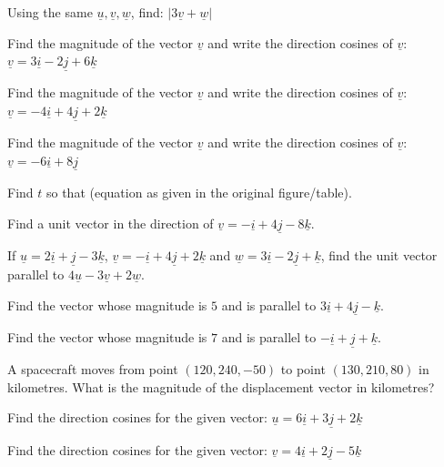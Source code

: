 \documentclass[11pt,a4paper]{article}
\begin{document}
\begin{shortlist}
\item Using the same $\underline{u},\underline{v},\underline{w}$, find: $|3\underline{v}+\underline{w}|$

\item Find the magnitude of the vector $\underline{v}$ and write the direction cosines of $\underline{v}$: $\underline{v}=3\underline{i}-2\underline{j}+6\underline{k}$

\item Find the magnitude of the vector $\underline{v}$ and write the direction cosines of $\underline{v}$: $\underline{v}=-4\underline{i}+4\underline{j}+2\underline{k}$

\item Find the magnitude of the vector $\underline{v}$ and write the direction cosines of $\underline{v}$: $\underline{v}=-6\underline{i}+8\underline{j}$

\item Find $t$ so that (equation as given in the original figure/table).

\item Find a unit vector in the direction of $\underline{v}=-\underline{i}+4\underline{j}-8\underline{k}$.

\item If $\underline{u}=2\underline{i}+\underline{j}-3\underline{k}$, $\underline{v}=-\underline{i}+4\underline{j}+2\underline{k}$ and $\underline{w}=3\underline{i}-2\underline{j}+\underline{k}$, find the unit vector parallel to $4\underline{u}-3\underline{v}+2\underline{w}$.

\item Find the vector whose magnitude is $5$ and is parallel to $3\underline{i}+4\underline{j}-\underline{k}$.

\item Find the vector whose magnitude is $7$ and is parallel to $-\underline{i}+\underline{j}+\underline{k}$.

\item A spacecraft moves from point $(120,240,-50)$ to point $(130,210,80)$ in kilometres. What is the magnitude of the displacement vector in kilometres?

\item Find the direction cosines for the given vector: $\underline{u}=6\underline{i}+3\underline{j}+2\underline{k}$

\item Find the direction cosines for the given vector: $\underline{v}=4\underline{i}+2\underline{j}-5\underline{k}$


\end{shortlist}
\end{document}
